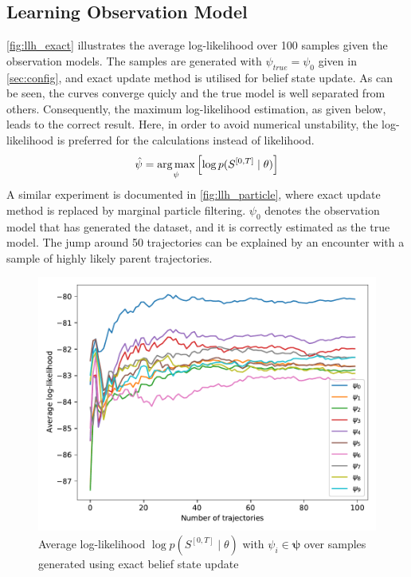 \subsection{Learning Observation Model}
\autoref{fig:llh_exact} illustrates the average log-likelihood over 100 samples given the observation models. The samples are generated with $ \psi_{true} = \psi_0 $ given in \cref{sec:config}, and exact update method is utilised for belief state update. As can be seen, the curves converge quicly and the true model is well separated from others. Consequently, the maximum log-likelihood estimation, as given below, leads to the correct result. Here, in order to avoid numerical unstability, the log-likelihood is preferred for the calculations instead of likelihood.
\begin{equation}
\hat{\psi} = \operatorname*{arg\,max}_\psi \left[ \log p(S^{[0,T]} \mid \theta )\right] 
\label{eq:max_llh_est}
\end{equation}
A similar experiment is documented in \autoref{fig:llh_particle}, where exact update method is replaced by marginal particle filtering. $ \psi_0 $ denotes the observation model that has generated the dataset, and it is correctly estimated as the true model. The jump around 50 trajectories can be explained by an encounter with a sample of highly likely parent trajectories.
\begin{figure}[H]
	\begin{center}
		\includegraphics[width=.7\textwidth]{figures/roc_analysis/roc_exactUpdate/llh_exactUpdate_psi_0}
		\caption[Average log-likelihood in the case of exact belief update]{Average log-likelihood $ \log p(S^{[0,T]} \mid \theta) $ with $ \psi_i \in \symbf{\psi} $ over samples generated using exact belief state update}
		\label{fig:llh_exact}
	\end{center}
\end{figure}
